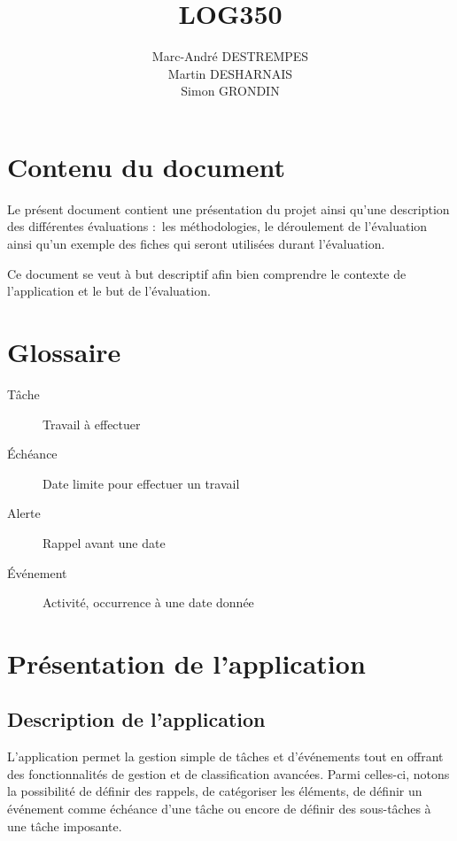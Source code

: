 \documentclass[letterpaper, oneside, 12pt,these,creativecommons]{thETS}
\title{LOG350}
\author{Marc-André DESTREMPES\\Martin DESHARNAIS\\Simon GRONDIN}
\begin{document}



\tableofcontents

\listoftables


\chapter{Contenu du document}

Le présent document contient une présentation du projet ainsi qu'une description des différentes évaluations $:$ les méthodologies, le déroulement de l'évaluation ainsi qu'un exemple des fiches qui seront utilisées durant l'évaluation.

Ce document se veut à but descriptif afin bien comprendre le contexte de l'application et le but de l'évaluation.

\chapter{Glossaire}

\begin{description}
\item [Tâche] Travail à effectuer
\item [Échéance] Date limite pour effectuer un travail
\item [Alerte] Rappel avant une date
\item [Événement] Activité, occurrence à une date donnée
\end{description}

\glsaddall
\printglossaries

\chapter{Présentation de l'application}

\section{Description de l'application}

L’application permet la gestion simple de tâches et d’événements tout en offrant des fonctionnalités de gestion et de classification avancées. Parmi celles-ci, notons la possibilité de définir des rappels, de catégoriser les éléments, de définir un événement comme échéance d'une tâche ou encore de définir des sous-tâches à une tâche imposante.
\end{document}
